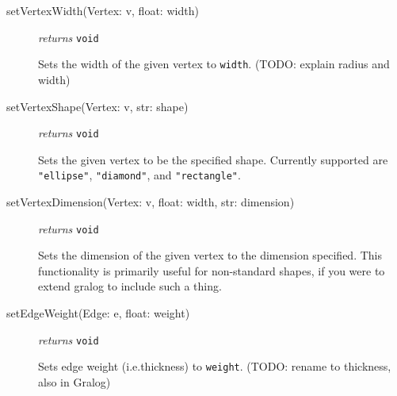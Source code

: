 \documentclass{article}
\begin{document}
\begin{description}
\item[setVertexWidth(Vertex: v, float: width)] \emph{returns}
  \texttt{void}

Sets the width of the given vertex to \texttt{width}. (TODO: explain
radius and width)

\item[setVertexShape(Vertex: v, str: shape)] \emph{returns} \texttt{void}

Sets the given vertex to be the specified shape. Currently supported
are \texttt{"ellipse"}, \texttt{"diamond"}, and \texttt{"rectangle"}.
  
\item[setVertexDimension(Vertex: v, float: width, str: dimension)]
  \emph{returns} \texttt{void}

Sets the dimension of the given vertex to the dimension specified. This functionality is primarily useful for non-standard shapes, if you were to extend gralog to include such a thing.  

\item[setEdgeWeight(Edge: e, float: weight)] \emph{returns} \texttt{void}

Sets edge weight (i.e.\@ thickness) to \texttt{weight}. (TODO: rename
to thickness, also in Gralog)
  
\end{description}
\end{document}
